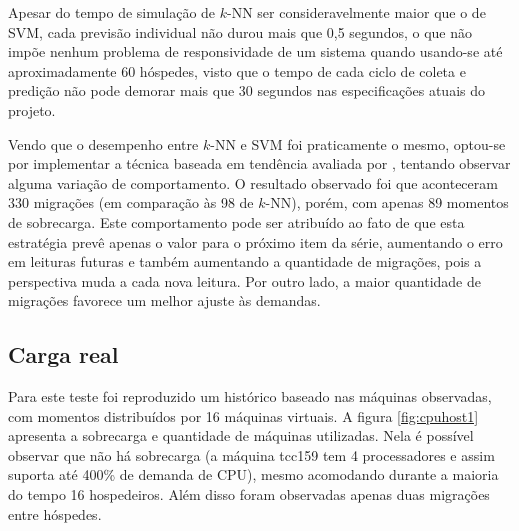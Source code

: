 \begin{figure}[htp]
\centering
{}
\label{fig:cpuhost0}
\end{figure}

Apesar do tempo de simulação de $k$-NN ser consideravelmente maior que o de
SVM, cada previsão individual não durou mais que 0,5 segundos, o que não impõe
nenhum problema de responsividade de um sistema quando usando-se até
aproximadamente 60 hóspedes, visto que o tempo de cada ciclo de coleta e
predição não pode demorar mais que 30 segundos nas especificações atuais do
projeto.

Vendo que o desempenho entre $k$-NN e SVM foi praticamente o mesmo, optou-se por
implementar a técnica baseada em tendência avaliada por
, tentando observar alguma variação de
comportamento. O resultado observado foi que aconteceram 330 migrações (em
comparação às 98 de $k$-NN), porém, com apenas 89 momentos de sobrecarga. Este
comportamento pode ser atribuído ao fato de que esta estratégia prevê apenas o
valor para o próximo item da série, aumentando o erro em leituras futuras e
também aumentando a quantidade de migrações, pois a perspectiva muda a cada nova
leitura. Por outro lado, a maior quantidade de migrações favorece um melhor
ajuste às demandas.

\begin{figure}[htp]
\centering
{}
\label{fig:cpuhost0}
\end{figure}

\subsection{Carga real}

Para este teste foi reproduzido um histórico baseado nas máquinas observadas,
com momentos distribuídos por 16 máquinas virtuais. A figura \ref{fig:cpuhost1}
apresenta a sobrecarga e quantidade de máquinas utilizadas. Nela é possível
observar que não há sobrecarga (a máquina tcc159 tem 4 processadores e assim
suporta até 400\% de demanda de CPU), mesmo acomodando durante a maioria do
tempo 16 hospedeiros. Além disso foram observadas apenas duas migrações entre
hóspedes.

